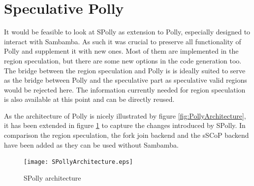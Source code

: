 





\section{Speculative Polly}
It would be feasible to look at SPolly as extension to Polly, especially designed
to interact with Sambamba. As such it was crucial to preserve all functionality 
of Polly and supplement it with new ones. Most of them are
implemented in the region speculation, but there are some new options in the 
code generation too. The bridge between the region speculation and Polly 
is is ideally suited to serve as the 
bridge between Polly and the speculative part as speculative valid regions 
would be rejected here. The information currently needed for region speculation
is also available at this point and can be directly reused. 

As the architecture of Polly is nicely illustrated by figure 
\ref{fig:PollyArchitecture}, it has been extended in figure 
\ref{fig:SPollyArchitecture} to capture the changes introduced by SPolly. 
In comparison the region speculation, the fork join backend and the sSCoP
backend have been added as they can be used without Sambamba. 

\begin{figure}[htbp]
  \centering
  \texttt{[image: SPollyArchitecture.eps]}
  \caption{SPolly architecture}
  \label{fig:SPollyArchitecture}  
\end{figure}



